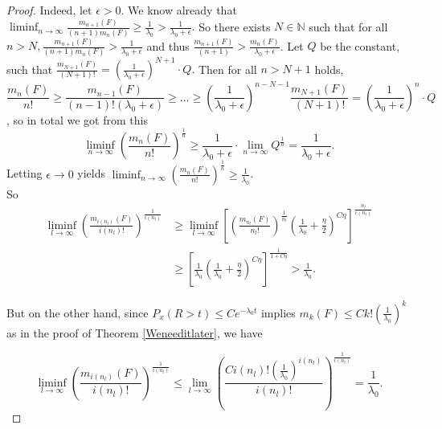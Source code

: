 \documentclass[12pt,a4paper]{scrartcl}
\numberwithin{equation}{section}
\newcommand{\N}{\mathbb{N}} %
\begin{document}
\begin{proof}
Indeed, let $ \epsilon > 0 $. We know already that $\liminf_{n \to \infty} \frac{m_{n+1}\left(F\right)}{\left(n+1\right) m_n\left(F\right)} \geq \frac{1}{\lambda_0} > \frac{1}{\lambda_0 + \epsilon}.$ So there exists $N \in \N$ such that for all $ n > N , \frac{m_{n+1}\left(F\right)}{\left(n+1\right) m_n\left(F\right)} > \frac{1}{\lambda_0 + \epsilon}$ and thus $\frac{m_{n+1}\left(F\right)}{\left(n+1\right) } > \frac{m_n\left(F\right)}{\lambda_0+\epsilon}$.  Let $ Q $ be the constant, such that $ \frac{m_{N+1}\left(F\right)}{\left(N+1\right)! } = \left(\frac{1}{\lambda_0+\epsilon}\right)^{N+1} \cdot Q.$ Then for all $ n > N+1 $ holds,
$$ \frac{m_n\left(F\right)}{n!} \geq \frac{m_{n-1}\left(F\right)}{\left(n-1\right)! \left(\lambda_0+\epsilon\right)}\geq \ldots \geq \left(\frac{1}{\lambda_0+\epsilon}\right)^{n-N-1}\frac{m_{N+1}\left(F\right)}{\left(N+1\right)!} = \left(\frac{1}{\lambda_0+\epsilon}\right)^{n} \cdot Q $$, so in total we got from this
$$ \liminf_{n \to \infty} \left(\frac{m_n\left(F\right)}{n!}\right)^{\frac{1}{n}} \geq \frac{1}{\lambda_0+\epsilon} \cdot \lim_{n \to \infty} Q^{\frac{1}{n}} = \frac{1}{\lambda_0+\epsilon}. $$
Letting $ \epsilon \to 0 $ yields $ \liminf_{n \to \infty} \left(\frac{m_n\left(F\right)}{n!}\right)^{\frac{1}{n}} \geq \frac{1}{\lambda_0}$.\\[2ex]

So
\begin{align*}
\liminf_{l \to \infty} \left(\frac{m_{i\left(n_l\right)}\left(F\right)}{i\left(n_l\right)!} \right)^{\frac{1}{i\left(n_l\right)}} &\geq \liminf_{l \to \infty} \left[ \left(\frac{m_{n_l}\left(F\right)}{n_l!}\right)^{\frac{1}{n_l}} \left(\frac{1}{\lambda_0} + \frac{\eta}{2}\right)^{C\eta}\right]^{\frac{n_l}{i\left(n_l\right)}} \\
&\geq \left[\frac{1}{\lambda_0} \left(\frac{1}{\lambda_0} + \frac{\eta}{2}\right)^{C\eta} \right]^{\frac{1}{1+C\eta}} > \frac{1}{\lambda_0}.
\end{align*}

But on the other hand, since $ P_x\left(R > t\right) \leq Ce^{-\lambda_0 t} $ implies $ m_k\left(F\right) \leq C k! \left(\frac{1}{\lambda_0}\right)^k $ as in the proof of Theorem \ref{Weneeditlater}, we have

$$ \liminf_{l \to \infty} \left(\frac{m_{i\left(n_l\right)}\left(F\right)}{i\left(n_l\right)!} \right)^{\frac{1}{i\left(n_l\right)}} \leq \lim_{l \to \infty} \left(\frac{C i\left(n_l\right)! \left(\frac{1}{\lambda_0}\right)^{i\left(n_l\right)}}{i\left(n_l\right)!}\right)^{\frac{1}{i\left(n_l\right)}} = \frac{1}{\lambda_0}.$$


\end{proof}
\end{document}
